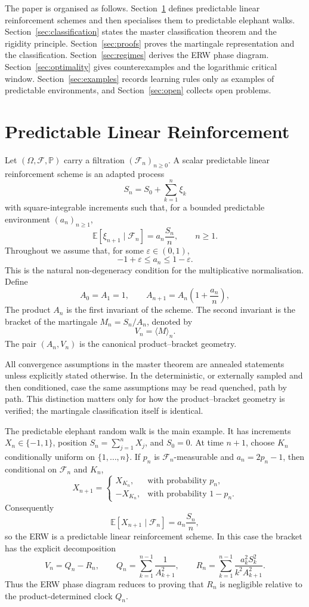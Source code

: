\documentclass[11pt]{article}
\theoremstyle{definition}
\theoremstyle{remark}
\newcommand{\F}{\mathcal{F}}
\newcommand{\E}{\mathbb{E}}
\newcommand{\Pbb}{\mathbb{P}}
\newcommand{\1}{\mathbf{1}}
\begin{document}
The paper is organised as follows. Section~\ref{sec:model} defines predictable
linear reinforcement schemes and then specialises them to predictable elephant
walks. Section~\ref{sec:classification} states the master classification theorem
and the rigidity principle. Section~\ref{sec:proofs} proves the martingale
representation and the classification. Section~\ref{sec:regimes} derives the
ERW phase diagram. Section~\ref{sec:optimality} gives counterexamples and the
logarithmic critical window. Section~\ref{sec:examples} records learning rules
only as examples of predictable environments, and Section~\ref{sec:open}
collects open problems.

\section{Predictable Linear Reinforcement}\label{sec:model}

Let \((\Omega,\F,\Pbb)\) carry a filtration \((\F_n)_{n\ge0}\). A scalar
predictable linear reinforcement scheme is an adapted process
\[
  S_n=S_0+\sum_{k=1}^n \xi_k
\]
with square-integrable increments such that, for a bounded predictable
environment \((a_n)_{n\ge1}\),
\[
  \E[\xi_{n+1}\mid\F_n]=a_n\frac{S_n}{n},
  \qquad n\ge1.
\]
Throughout we assume that, for some \(\varepsilon\in(0,1)\),
\[
  -1+\varepsilon\le a_n\le 1-\varepsilon.
\]
This is the natural non-degeneracy condition for the multiplicative
normalisation. Define
\[
  A_0=A_1=1,\qquad
  A_{n+1}=A_n\left(1+\frac{a_n}{n}\right),
\]
The product \(A_n\) is the first invariant of the scheme. The second invariant
is the bracket of the martingale \(M_n=S_n/A_n\), denoted by
\[
  V_n=\langle M\rangle_n.
\]
The pair \((A_n,V_n)\) is the canonical product--bracket geometry.

All convergence assumptions in the master theorem are annealed statements unless
explicitly stated otherwise. In the deterministic, or externally sampled and then
conditioned, case the same assumptions may be read quenched, path by path. This
distinction matters only for how the product--bracket geometry is verified; the
martingale classification itself is identical.

The predictable elephant random walk is the main example. It has increments
\(X_n\in\{-1,1\}\), position \(S_n=\sum_{j=1}^nX_j\), and \(S_0=0\). At time
\(n+1\), choose \(K_n\) conditionally uniform on \(\{1,\ldots,n\}\). If
\(p_n\) is \(\F_n\)-measurable and \(a_n=2p_n-1\), then conditional on
\(\F_n\) and \(K_n\),
\[
  X_{n+1}=
  \begin{cases}
  X_{K_n}, & \text{with probability }p_n,\\
  -X_{K_n}, & \text{with probability }1-p_n.
  \end{cases}
\]
Consequently
\[
  \E[X_{n+1}\mid\F_n]=a_n\frac{S_n}{n},
\]
so the ERW is a predictable linear reinforcement scheme. In this case the
bracket has the explicit decomposition
\[
  V_n=Q_n-R_n,\qquad
  Q_n=\sum_{k=1}^{n-1}\frac1{A_{k+1}^2},\qquad
  R_n=\sum_{k=1}^{n-1}\frac{a_k^2S_k^2}{k^2A_{k+1}^2}.
\]
Thus the ERW phase diagram reduces to proving that \(R_n\) is negligible
relative to the product-determined clock \(Q_n\).
\end{document}
